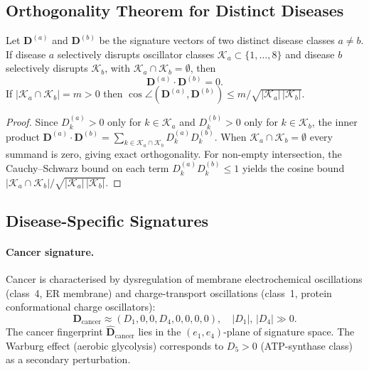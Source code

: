 \subsection{Orthogonality Theorem for Distinct Diseases}

\begin{theorem}
\label{thm:ch04-orthogonal-signatures}
Let $\mathbf{D}^{(a)}$ and $\mathbf{D}^{(b)}$ be the signature vectors of
two distinct disease classes $a \neq b$.  If disease $a$ selectively
disrupts oscillator classes $\mathcal{K}_a \subset \{1,\ldots,8\}$ and
disease $b$ selectively disrupts $\mathcal{K}_b$, with
$\mathcal{K}_a \cap \mathcal{K}_b = \emptyset$, then
\begin{equation}
    \mathbf{D}^{(a)} \cdot \mathbf{D}^{(b)} = 0.
\end{equation}
If $|\mathcal{K}_a \cap \mathcal{K}_b| = m > 0$ then
$\cos\angle(\mathbf{D}^{(a)}, \mathbf{D}^{(b)}) \leq m /
\sqrt{|\mathcal{K}_a|\,|\mathcal{K}_b|}$.
\end{theorem}

\begin{proof}
Since $D_k^{(a)} > 0$ only for $k \in \mathcal{K}_a$ and
$D_k^{(b)} > 0$ only for $k \in \mathcal{K}_b$, the inner product
$\mathbf{D}^{(a)} \cdot \mathbf{D}^{(b)} = \sum_{k \in \mathcal{K}_a \cap
\mathcal{K}_b} D_k^{(a)} D_k^{(b)}$.
When $\mathcal{K}_a \cap \mathcal{K}_b = \emptyset$ every summand is zero,
giving exact orthogonality.  For non-empty intersection, the Cauchy--Schwarz
bound on each term $D_k^{(a)} D_k^{(b)} \leq 1$ yields the cosine bound
$|\mathcal{K}_a \cap \mathcal{K}_b|/\sqrt{|\mathcal{K}_a|\,|\mathcal{K}_b|}$.
\end{proof}

\subsection{Disease-Specific Signatures}

\paragraph{Cancer signature.}
Cancer is characterised by dysregulation of membrane electrochemical
oscillations (class~4, ER membrane) and charge-transport oscillations
(class~1, protein conformational charge oscillators):
\begin{equation}
    \mathbf{D}_{\mathrm{cancer}} \approx (D_1, 0, 0, D_4, 0, 0, 0, 0),
    \quad |D_1|,\,|D_4| \gg 0.
\end{equation}
The cancer fingerprint $\hat{\mathbf{D}}_{\mathrm{cancer}}$ lies in the
$(e_1,e_4)$-plane of signature space.  The Warburg effect (aerobic
glycolysis) corresponds to $D_5 > 0$ (ATP-synthase class) as a secondary
perturbation.

